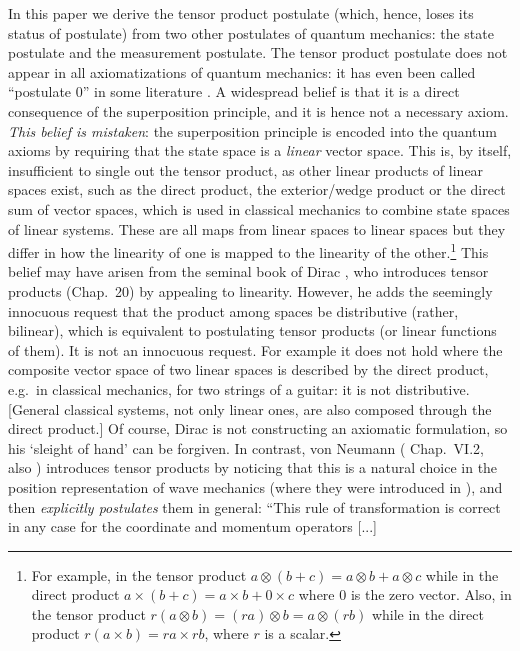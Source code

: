 \documentclass[aps,prl,amsmath,amssymb,twocolumn]{revtex4}
\theoremstyle{plain}
\theoremstyle{definition}
\theoremstyle{remark}
\begin{document}
	In this paper we derive the tensor product postulate (which, hence,
	loses its status of postulate) from two other postulates of quantum
	mechanics: the state postulate and the measurement postulate.
	The tensor product postulate does not appear in all axiomatizations of
	quantum mechanics: it has even been called ``postulate 0'' in some
	literature \cite{zurek}. A widespread belief is that it is a direct
	consequence of the superposition principle, and it is hence not a
	necessary axiom. {\em This belief is mistaken}: the superposition
	principle is encoded into the quantum axioms by requiring that the
	state space is a {\em linear} vector space. This is, by itself,
	insufficient to single out the tensor product, as other linear
	products of linear spaces exist, such as the direct product, the exterior/wedge product or the direct sum of vector spaces, which is used
	in classical mechanics to combine state spaces of linear systems. These are all maps from linear spaces to linear spaces but they differ in how the linearity of one is mapped to the linearity of the other.\footnote{For example, in the tensor product $a \otimes (b+c) = a \otimes b + a \otimes c$ while in the direct product $a \times (b+c) = a \times b + 0 \times c$ where $0$ is the zero vector. Also, in the tensor product $r  (a \otimes b) = (r a) \otimes b = a \otimes (r b)$ while in the direct product $r  (a \times b) = r a \times r b$, where $r$ is a scalar.}
	This belief may have arisen from the seminal book of Dirac
	\cite{diracbook}, who introduces tensor products (Chap.~20) by
	appealing to linearity. However, he adds the seemingly innocuous
	request that the product among spaces be distributive (rather,
	bilinear), which is equivalent to postulating tensor products (or
	linear functions of them). It is not an innocuous request. For
	example it does not hold where the composite vector space of two
	linear spaces is described by the direct product, e.g.~in classical
	mechanics, for two strings of a guitar: it is not distributive.
	[General classical systems, not only linear ones, are also composed
	through the direct product.] Of course, Dirac is not constructing an
	axiomatic formulation, so his `sleight of hand' can be forgiven. In
	contrast, von Neumann (\cite{vonneumannbook} Chap.~VI.2, also
	\cite{jauch}) introduces tensor products by noticing that this is a
	natural choice in the position representation of wave mechanics (where
	they were introduced in \cite{weyl,epr}), and then {\em explicitly
		postulates} them in general: ``This rule of transformation is
	correct in any case for the coordinate and momentum operators [...]
\end{document}
